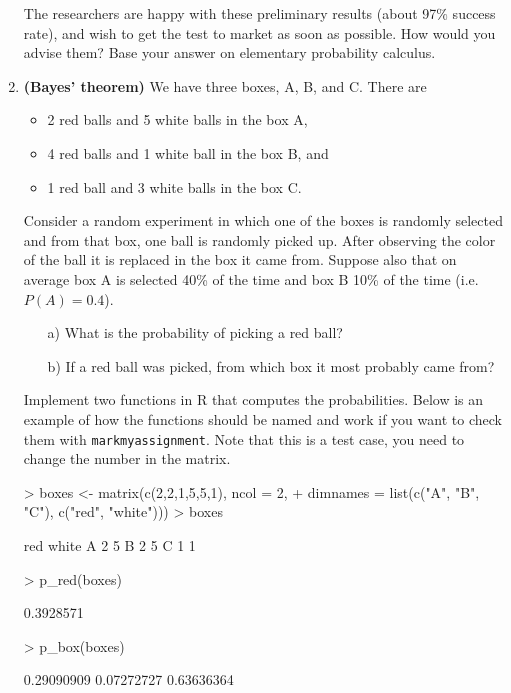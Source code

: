 \documentclass[11pt,a4paper,english]{article}
\begin{document}
\begin{enumerate}
  The researchers are happy with these preliminary results (about 97$\%$
  success rate), and wish to get the test to market as soon as possible. How would you advise them? Base your answer on elementary probability calculus.


\item {\bf (Bayes' theorem)} We have three boxes, A, B, and C. There are
  \begin{itemize}
    \item 2 red balls and 5 white balls in the box A,
    \item 4 red balls and 1 white ball in the box B, and
    \item 1 red ball and 3 white balls in the box C.
  \end{itemize}
Consider a random experiment in which one of the boxes is randomly
selected and from that box, one ball is randomly picked up. After
observing the color of the ball it is replaced in the box it came
from. Suppose also that on average box A is selected 40\% of the time
and box B 10\% of the time (i.e. $P(A) = 0.4$).

\begin{itemize}
\item[a)] What is the probability of picking a red ball? 
\item[b)] If a red ball was picked, from which box it most probably came from? 
\end{itemize}

Implement two functions in R that computes the probabilities. Below is an example of how the functions should be named and work if you want to check them with \texttt{markmyassignment}. 
Note that this is a test case, you need to change the number in the matrix.

\begin{Schunk}
\begin{Sinput}
> boxes <- matrix(c(2,2,1,5,5,1), ncol = 2, 
+    dimnames = list(c("A", "B", "C"), c("red", "white")))
> boxes
\end{Sinput}
\begin{Soutput}
  red white
A   2     5
B   2     5
C   1     1
\end{Soutput}
\end{Schunk}


\begin{Schunk}
\begin{Sinput}
> p_red(boxes)
\end{Sinput}
\begin{Soutput}
[1] 0.3928571
\end{Soutput}
\begin{Sinput}
> p_box(boxes)
\end{Sinput}
\begin{Soutput}
[1] 0.29090909 0.07272727 0.63636364
\end{Soutput}
\end{Schunk}



\end{enumerate}
\end{document}
